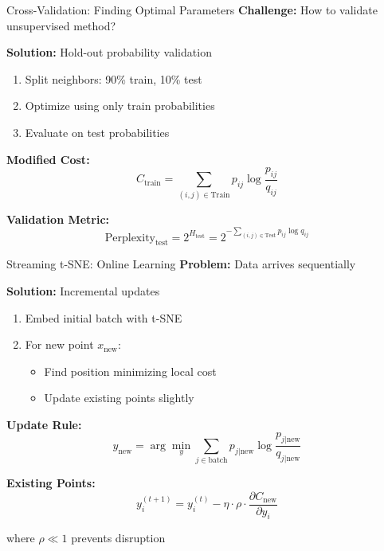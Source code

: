\begin{frame}{Cross-Validation: Finding Optimal Parameters}
\textbf{Challenge:} How to validate unsupervised method?
  
  \textbf{Solution:} Hold-out probability validation
\begin{enumerate}
\item Split neighbors: 90\% train, 10\% test
\item Optimize using only train probabilities
\item Evaluate on test probabilities
\end{enumerate}

\textbf{Modified Cost:}
$$C_{\text{train}} = \sum_{(i,j) \in \text{Train}} p_{ij} \log \frac{p_{ij}}{q_{ij}}$$
  
  \textbf{Validation Metric:}
$$\text{Perplexity}_{\text{test}} = 2^{H_{\text{test}}} = 2^{-\sum_{(i,j) \in \text{Test}} p_{ij} \log q_{ij}}$$
  
  \begin{center}
\end{center}
\end{frame}

\begin{frame}{Streaming t-SNE: Online Learning}
\textbf{Problem:} Data arrives sequentially

\textbf{Solution:} Incremental updates
\begin{enumerate}
\item Embed initial batch with t-SNE
\item For new point $x_{\text{new}}$:
  \begin{itemize}
\item Find position minimizing local cost
\item Update existing points slightly
\end{itemize}
\end{enumerate}

\textbf{Update Rule:}
$$y_{\text{new}} = \arg\min_y \sum_{j \in \text{batch}} p_{j|\text{new}} \log \frac{p_{j|\text{new}}}{q_{j|\text{new}}}$$
  
  \textbf{Existing Points:}
$$y_i^{(t+1)} = y_i^{(t)} - \eta \cdot \rho \cdot \frac{\partial C_{\text{new}}}{\partial y_i}$$
  
  where $\rho \ll 1$ prevents disruption

\end{frame}

